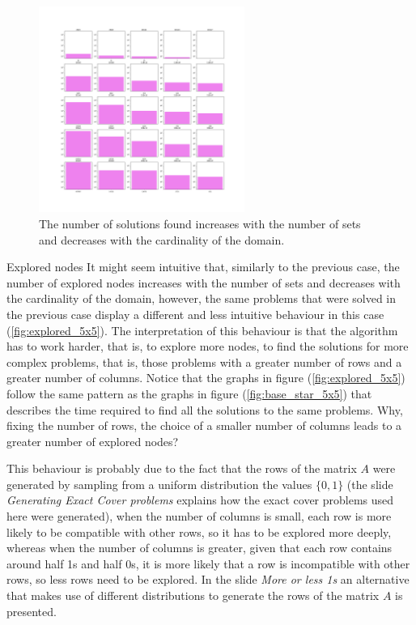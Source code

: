 \documentclass{beamer}
\begin{document}
\begin{frame}
    \begin{figure}
        \centering
        \includegraphics[width=0.6\textwidth]{sol_5x5.pdf}
        \caption{The number of solutions found increases with the number of sets 
        and decreases with the cardinality of the domain.}
        \label{fig:sol_5x5}
    \end{figure}
\end{frame}

\begin{frame}{Explored nodes}
    It might seem intuitive that, similarly to the previous case, the number of explored nodes
    increases with the number of sets and decreases with the cardinality of the domain,
    however, the same problems that were solved in the previous case display a different
    and less intuitive behaviour in this case (\ref{fig:explored_5x5}).
    The interpretation of this behaviour is that the algorithm has to work harder,
    that is, to explore more nodes, to find the solutions for more complex problems, that
    is, those problems with a greater number of rows and a greater number of columns.
    Notice that the graphs in figure (\ref{fig:explored_5x5}) follow the same pattern
    as the graphs in figure (\ref{fig:base_star_5x5}) that describes the time required to find all
    the solutions to the same problems.
    Why, fixing the number of rows, the choice of a smaller number of columns leads to a greater
    number of explored nodes? 
\end{frame}    

\begin{frame}{}    
    This behaviour is probably due to the fact that the rows
    of the matrix $A$ were generated by sampling from a uniform distribution the values 
    $\{0, 1\}$ (the slide \textit{Generating Exact Cover problems} explains how 
    the exact cover problems used here were generated), when the number of columns is small, each row is more likely to be 
    compatible with other rows, so it has to be explored more deeply, whereas when the 
    number of columns is greater, given that each row contains around half 1s and half 0s,
    it is more likely that a row is incompatible with other rows, so less rows need to be 
    explored.
    In the slide \textit{More or less 1s} an alternative that
    makes use of different distributions to generate the rows of the matrix $A$ is presented.
\end{frame}
\end{document}
